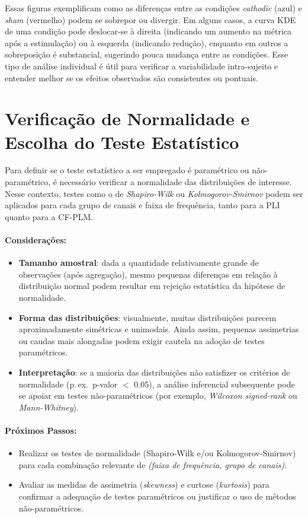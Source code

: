 Essas figuras exemplificam como as diferenças entre as condições \emph{cathodic} (azul) e \emph{sham} (vermelho) podem se sobrepor ou divergir. Em alguns casos, a curva KDE de uma condição pode deslocar-se à direita (indicando um aumento na métrica após a estimulação) ou à esquerda (indicando redução), enquanto em outros a sobreposição é substancial, sugerindo pouca mudança entre as condições. Esse tipo de análise individual é útil para verificar a variabilidade intra-sujeito e entender melhor se os efeitos observados são consistentes ou pontuais.

\section{Verificação de Normalidade e Escolha do Teste Estatístico}
Para definir se o teste estatístico a ser empregado é paramétrico ou não-paramétrico, é necessário verificar a normalidade das distribuições de interesse. Nesse contexto, testes como o de \emph{Shapiro-Wilk} ou \emph{Kolmogorov-Smirnov} podem ser aplicados para cada grupo de canais e faixa de frequência, tanto para a PLI quanto para a CF-PLM.

\paragraph{Considerações:}
\begin{itemize}
    \item \textbf{Tamanho amostral}: dada a quantidade relativamente grande de observações (após agregação), mesmo pequenas diferenças em relação à distribuição normal podem resultar em rejeição estatística da hipótese de normalidade.
    \item \textbf{Forma das distribuições}: visualmente, muitas distribuições parecem aproximadamente simétricas e unimodais. Ainda assim, pequenas assimetrias ou caudas mais alongadas podem exigir cautela na adoção de testes paramétricos.
    \item \textbf{Interpretação}: se a maioria das distribuições não satisfizer os critérios de normalidade (p.\,ex.\ p-valor $<$ 0.05), a análise inferencial subsequente pode se apoiar em testes não-paramétricos (por exemplo, \emph{Wilcoxon signed-rank} ou \emph{Mann-Whitney}).
\end{itemize}

\paragraph{Próximos Passos:}
\begin{itemize}
    \item Realizar os testes de normalidade (Shapiro-Wilk e/ou Kolmogorov-Smirnov) para cada combinação relevante de \emph{(faixa de frequência, grupo de canais)}.
    \item Avaliar as medidas de assimetria (\emph{skewness}) e curtose (\emph{kurtosis}) para confirmar a adequação de testes paramétricos ou justificar o uso de métodos não-paramétricos.
\end{itemize}

